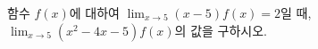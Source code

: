 함수 $f(x)$에 대하여 $\displaystyle\lim_{x\to 5}(x-5)f(x)=2$일 때, $\displaystyle\lim_{x\to 5}(x^2-4x-5)f(x)$의 값을 구하시오.
